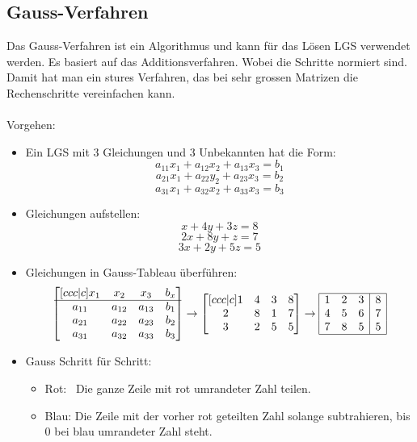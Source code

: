 \subsection{Gauss-Verfahren}
	Das Gauss-Verfahren ist ein Algorithmus und kann für das Lösen LGS verwendet werden. Es basiert auf das Additionsverfahren. Wobei die Schritte normiert sind. Damit hat man ein stures Verfahren, das bei sehr grossen Matrizen die Rechenschritte vereinfachen kann. \\ \\
	Vorgehen:
	\begin{itemize}
		\item Ein LGS mit 3 Gleichungen und 3 Unbekannten hat die Form: \\
			$$		a_{11}x_1 + a_{12}x_2 + a_{13}x_3 = b_1 $$
			$$		a_{21}x_1 + a_{22}y_2 + a_{23}x_3 = b_2 $$
			$$		a_{31}x_1 + a_{32}x_2 + a_{33}x_3 = b_3 $$
		\item Gleichungen aufstellen:
			$$ x + 4y + 3z = 8 $$
			$$ 2x + 8y + z = 7 $$
			$$ 3x + 2y + 5z = 5 $$
		\item Gleichungen in Gauss-Tableau überführen:
			\begin{equation*}
				\begin{bmatrix}[ccc|c]
					x_1		& x_2	 & x_3		& b_x \\
					\hline
					a_{11}	& a_{12} & a_{13}	& b_1 \\ 
					a_{21}	& a_{22} & a_{23}	& b_2 \\ 
					a_{31}	& a_{32} & a_{33}	& b_3
				\end{bmatrix}
				\rightarrow
				\begin{bmatrix}[ccc|c]
					1 & 4 & 3 & 8 \\ 
					2 & 8 & 1 & 7 \\ 
					3 & 2 & 5 & 5
				\end{bmatrix} 
				\rightarrow
				\begin{array}{|ccc|c|}
					\hline		
					1 & 2 & 3 & 8 \\
					4 & 5 & 6 & 7 \\
					7 & 8 & 5 & 5 \\
					\hline
				\end{array} 
			\end{equation*}
		\item Gauss Schritt für Schritt:
			\begin{itemize}
				\item Rot: {\quad}{\,} Die ganze Zeile mit rot umrandeter Zahl teilen.
				\item Blau:	{\quad}{\!} Die Zeile mit der vorher rot geteilten Zahl solange subtrahieren, bis 0 bei blau umrandeter Zahl steht.

\end{itemize}
\end{itemize}
